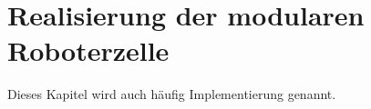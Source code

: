 \cleardoublepage
\chapter{Realisierung der modularen Roboterzelle}
\label{ch:Realisierung der modularen Roboterzelle}

Dieses Kapitel wird auch häufig Implementierung genannt. 


